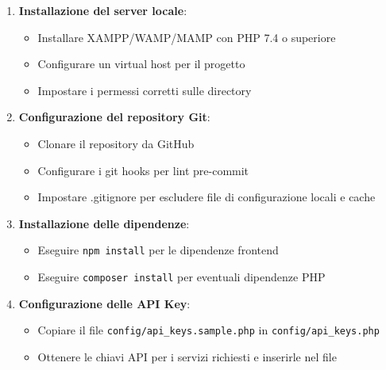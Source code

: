 \begin{enumerate}
    \item \textbf{Installazione del server locale}:
    \begin{itemize}
        \item Installare XAMPP/WAMP/MAMP con PHP 7.4 o superiore
        \item Configurare un virtual host per il progetto
        \item Impostare i permessi corretti sulle directory
    \end{itemize}
    
    \item \textbf{Configurazione del repository Git}:
    \begin{itemize}
        \item Clonare il repository da GitHub
        \item Configurare i git hooks per lint pre-commit
        \item Impostare .gitignore per escludere file di configurazione locali e cache
    \end{itemize}
    
    \item \textbf{Installazione delle dipendenze}:
    \begin{itemize}
        \item Eseguire \texttt{npm install} per le dipendenze frontend
        \item Eseguire \texttt{composer install} per eventuali dipendenze PHP
    \end{itemize}
    
    \item \textbf{Configurazione delle API Key}:
    \begin{itemize}
        \item Copiare il file \texttt{config/api\_keys.sample.php} in \texttt{config/api\_keys.php}
        \item Ottenere le chiavi API per i servizi richiesti e inserirle nel file
    \end{itemize}
\end{enumerate}

